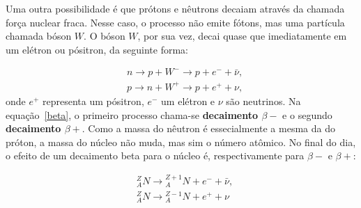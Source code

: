\documentclass{article}
\begin{document}
Uma outra possibilidade \'e que pr\'otons e n\^eutrons decaiam atrav\'es da chamada for\c ca nuclear fraca. Nesse caso, o processo n\~ao emite f\'otons, mas uma part\'icula chamada b\'oson $W$. O b\'oson $W$, por sua vez, decai quase que imediatamente em um el\'etron ou p\'ositron, da seguinte forma:

\begin{equation}\label{beta}
\begin{split}
&n \rightarrow p + W^-\rightarrow p + e^- + \bar{\nu},\\
&p \rightarrow n + W^+\rightarrow p + e^+ + \nu,
\end{split}
\end{equation}
onde $e^+$ representa um p\'ositron, $e^-$ um el\'etron e $\nu$ s\~ao neutrinos. Na equa\c c\~ao~\eqref{beta}, o primeiro processo chama-se \textbf{decaimento $\beta -$} e o segundo \textbf{decaimento $\beta +$}. Como a massa do n\^eutron \'e essecialmente a mesma da do pr\'oton, a massa do n\'ucleo n\~ao muda, mas sim o n\'umero at\^omico. No final do dia, o efeito de um decaimento beta para o n\'ucleo \'e, respectivamente para $\beta -$ e $\beta +$:

\begin{equation}
\begin{split}
&{}^Z_AN \rightarrow {}^{Z+1}_AN + e^- + \bar{\nu},\\
&{}^Z_AN \rightarrow {}^{Z-1}_AN + e^+ + \nu
\end{split}
\end{equation}
\end{document}
